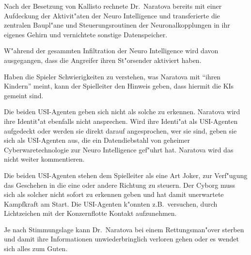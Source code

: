 \begin{remarks}
	Nach der Besetzung von Kallisto rechnete Dr.~Naratova bereits mit einer Aufdeckung der Aktivit"aten der Neuro Intelligence und transferierte die zentralen Baupl"ane und Steuerungsroutinen der Neuronalkopplungen in ihr eigenes Gehirn und vernichtete sonstige Datenspeicher.
	
	W"ahrend der gesammten Infiltration der Neuro Intelligence wird davon ausgegangen, dass die Angreifer ihren St"orsender aktiviert haben.
	
	Haben die Spieler Schwierigkeiten zu verstehen, was Naratova mit "`ihren Kindern"' meint, kann der Spielleiter den Hinweis geben, dass hiermit die KIs gemeint sind.
	
	Die beiden USI-Agenten geben sich nicht als solche zu erkennen. Naratova wird ihre Identit"at ebenfalls nicht ansprechen. Wird ihre Identi"at als USI-Agenten aufgedeckt oder werden sie direkt darauf angesprochen, wer sie sind, geben sie sich als USI-Agenten aus, die ein Datendiebstahl von geheimer Cyberwaretechnologie zur Neuro Intelligence gef"uhrt hat. Naratova wird das nicht weiter kommentieren.
	
	Die beiden USI-Agenten stehen dem Spielleiter als eine Art Joker, zur Verf"ugung das Geschehen in die eine oder andere Richtung zu steuern. Der Cyborg muss sich als solcher nicht sofort zu erkennen geben und hat damit unerwartete Kampfkraft am Start. Die USI-Agenten k"onnten z.B.~versuchen, durch Lichtzeichen mit der Konzernflotte Kontakt aufzunehmen.
	
	Je nach Stimmungslage kann Dr.~Naratova bei einem Rettungsman"over sterben und damit ihre Informationen unwiederbringlich verloren gehen oder es wendet sich alles zum Guten.
\end{remarks}
